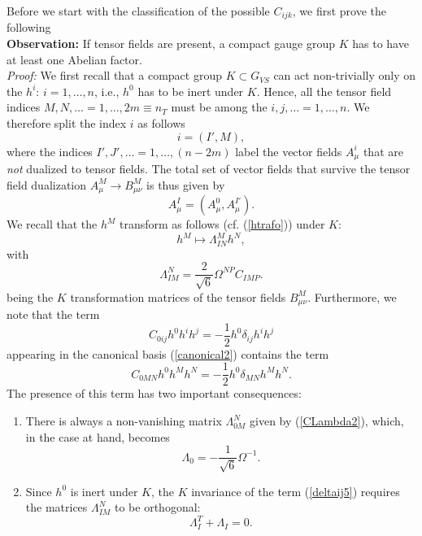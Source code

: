 \documentclass[a4paper,11pt]{article}
\begin{document}
Before we start with the classification of the possible $C_{ijk}$,
we first prove the following
\vspace{2mm} \\
\textbf{Observation:} If tensor fields are present, a compact
gauge group
$K$ has to have at least one Abelian factor.\\
\emph{Proof:} We first recall that a compact group $K\subset G_{VS}$
can act non-trivially only on the $h^{i}$: $i=1,\ldots, n$, i.e.,
$h^{0}$ has to be inert under $K$. Hence, all the tensor field
indices
$M,N,\ldots=1,\ldots, 2m\equiv n_{T}$ must be among the
$i,j,\ldots=1,\ldots, n$. We therefore split the index $i$ as
follows
\begin{displaymath}
i=(I',M),
\end{displaymath}
where the indices $I',J',\ldots=1,\ldots, (n-2m)$ label the vector
fields $A_{\mu}^{i}$ that are \emph{not} dualized to tensor
fields. The total set of vector fields that survive the tensor
field dualization $A_{\mu}^{M}\rightarrow B_{\mu\nu}^{M}$ is thus
given by
\begin{displaymath}
A_{\mu}^{I}=(A_{\mu}^{0},A_{\mu}^{I'}).
\end{displaymath}
We recall that the $h^{M}$ transform as follows (cf. 
(\ref{htrafo})) under $K$:
\begin{displaymath}
h^{M}\longmapsto \Lambda_{IN}^{M}h^{N},
\end{displaymath}
with
\begin{equation}\label{CLambda2}
\Lambda_{IM}^{N}=\frac{2}{\sqrt{6}}\Omega^{NP}C_{IMP}.
\end{equation}
being the $K$ transformation matrices of the tensor fields
$B_{\mu\nu}^{M}$.
Furthermore, we note that the term
\begin{displaymath}
C_{0ij}h^{0}h^{i}h^{j}=-\frac{1}{2} h^{0}\delta_{ij}h^{i}h^{j}
\end{displaymath}
appearing in the canonical basis (\ref{canonical2}) contains the
term
\begin{equation}\label{deltaij5}
C_{0MN}h^{0}h^{M}h^{N}=-\frac{1}{2}h^{0}\delta_{MN}h^{M}h^{N}.
\end{equation}
The presence of this term has two important consequences:
\begin{enumerate}
\item There is always a non-vanishing matrix $\Lambda_{0M}^{N}$ given
by (\ref{CLambda2}), which, in the case at hand, becomes
\begin{equation}\label{LisOmega}
\Lambda_{0}=-\frac{1}{\sqrt{6}}\Omega^{-1}.
\end{equation}

\item Since $h^{0}$ is inert under $K$, the $K$ invariance of the term
(\ref{deltaij5}) requires the matrices $\Lambda_{IM}^{N}$ to be
orthogonal:
\begin{equation}\label{Lisorthogonal}
\Lambda_{I}^{T}+\Lambda_{I}=0.
\end{equation}
\end{enumerate}
\end{document}
